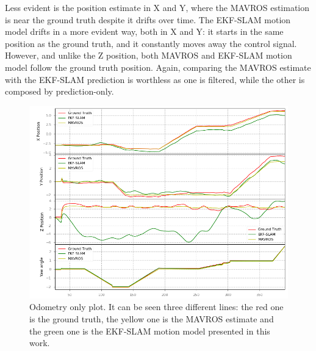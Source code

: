 Less evident is the position estimate in X and Y, where the MAVROS estimation is near the ground truth despite it drifts over time. The EKF-SLAM motion model drifts in a more evident way, both in X and Y: it starts in the same position as the ground truth, and it constantly moves away the control signal. However, and unlike the Z position, both MAVROS and EKF-SLAM motion model follow the ground truth position. Again, comparing the MAVROS estimate with the EKF-SLAM prediction is worthless as one is filtered, while the other is composed by prediction-only.
\begin{figure}
    \centering
    \includegraphics[width=\textwidth]{Images/fig19-odom_only}
    \caption[Odometry only plot]{Odometry only plot. It can be seen three different lines: the red one is the ground truth, the yellow one is the MAVROS estimate and the green one is the EKF-SLAM motion model presented in this work.}
    \label{fig:chapter3:odom-only}
\end{figure}

